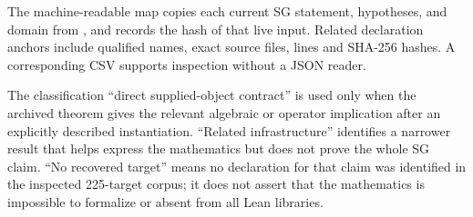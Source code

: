 \documentclass[11pt]{article}
\begin{document}
The machine-readable map \texttt{} copies each current SG statement, hypotheses, and domain from \texttt{}, and records the hash of that live input. Related declaration anchors include qualified names, exact source files, lines and SHA-256 hashes. A corresponding CSV supports inspection without a JSON reader.

The classification ``direct supplied-object contract'' is used only when the archived theorem gives the relevant algebraic or operator implication after an explicitly described instantiation. ``Related infrastructure'' identifies a narrower result that helps express the mathematics but does not prove the whole SG claim. ``No recovered target'' means no declaration for that claim was identified in the inspected 225-target corpus; it does not assert that the mathematics is impossible to formalize or absent from all Lean libraries.
\end{document}
